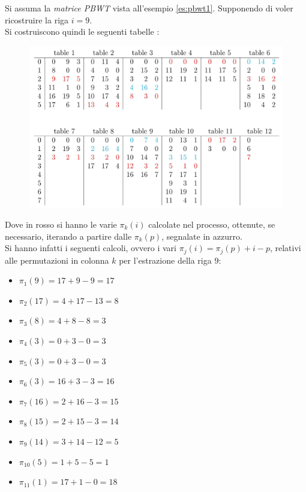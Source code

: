 \begin{esempio}
  Si assuma la \textit{matrice PBWT} vista all'esempio \ref{es:pbwt1}.
  Supponendo di voler ricostruire la riga $i=9$. \\
  Si costruiscono quindi le seguenti tabelle \cite{tricks}:
   \begin{figure}[H]
    \centering
    \includegraphics[width=\textwidth]{img/trick.jpg}
  \end{figure}
  Dove in rosso si hanno le varie $\pi_k(i)$ calcolate nel processo, ottenute,
  se necessario, iterando a partire dalle $\pi_k(p)$, segnalate in azzurro. \\
  Si hanno infatti i seguenti calcoli, ovvero i vari $\pi_j(i)=\pi_j(p)+i-p$,
  relativi alle permutazioni in colonna $k$ per l'estrazione della riga $9$:
  \begin{multicols}{2}
    \begin{itemize}
      \item $\pi_1(9)=17+9-9=17$
      \item $\pi_2(17)=4+17-13=8$
      \item $\pi_3(8)=4+8-8=3$
      \item $\pi_4(3)=0+3-0=3$
      \item $\pi_5(3)=0+3-0=3$
      \item $\pi_6(3)=16+3-3=16$
      \item $\pi_7(16)=2+16-3=15$
      \item $\pi_8(15)=2+15-3=14$
      \item $\pi_9(14)=3+14-12=5$
      \item $\pi_{10}(5)=1+5-5=1$
      \item $\pi_{11}(1)=17+1-0=18$

\end{itemize}
\end{multicols}
\end{esempio}
